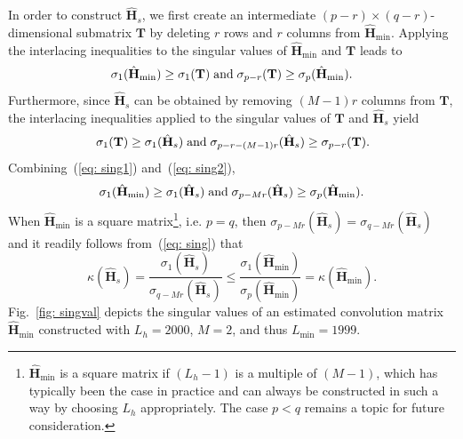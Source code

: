 \documentclass{article}
\begin{document}
In order to construct $\hat{\mathbf{H}}_s$, we first create an intermediate $(p-r)\times(q-r)$-dimensional submatrix $\mathbf{T}$ by deleting $r$ rows and $r$ columns from $\hat{\mathbf{H}}_{\min}$. 
Applying the interlacing inequalities to the singular values of $\hat{\mathbf{H}}_{\min}$ and $\mathbf{T}$ leads to
\begin{equation}
\label{eq: sing1}
  \sigma_{1}(\hat{\mathbf{H}}_{\min}) \geq \sigma_{1}(\mathbf{T}) \; {\rm and} \; \sigma_{p-r}(\mathbf{T})  \geq \sigma_{p}(\hat{\mathbf{H}}_{\min}).
\end{equation}
Furthermore, since $\hat{\mathbf{H}}_s$ can be obtained by removing $(M-1)r$ columns from $\mathbf{T}$, the interlacing inequalities applied to the singular values of $\mathbf{T}$ and $\hat{\mathbf{H}}_{s}$ yield
\begin{equation}
\label{eq: sing2}
\hspace{-0.02cm}  \sigma_{1}(\mathbf{T}) \geq \sigma_{1}(\hat{\mathbf{H}}_s) \; {\rm and} \;  \sigma_{p-r-(M-1)r}(\hat{\mathbf{H}}_s) \geq \sigma_{p-r}(\mathbf{T}). \hspace{-0.1cm}
\end{equation}
Combining~(\ref{eq: sing1}) and~(\ref{eq: sing2}),
\begin{equation}
\label{eq: sing}
 \sigma_1(\hat{\mathbf{H}}_{\min}) \geq \sigma_{1}(\hat{\mathbf{H}}_s) \; {\rm and} \; \sigma_{p-Mr}(\hat{\mathbf{H}}_s) \geq \sigma_{p}(\hat{\mathbf{H}}_{\min}).
\end{equation}
When $\hat{\mathbf{H}}_{\min}$ is a square matrix\footnote{$\hat{\mathbf{H}}_{\min}$ is a square matrix if $(L_h-1)$ is a multiple of $(M-1)$, which has typically been the case in practice and can always be constructed in such a way by choosing $L_h$ appropriately. The case $p<q$ remains a topic for future consideration.}, i.e. $p = q$, then $\sigma_{p-Mr}(\hat{\mathbf{H}}_s) = \sigma_{q-Mr}(\hat{\mathbf{H}}_s)$ and it readily follows from~(\ref{eq: sing}) that
\begin{equation}
\label{eq: condno}
\kappa(\hat{\mathbf{H}}_s) = \frac{\sigma_1(\hat{\mathbf{H}}_s)}{\sigma_{q-Mr}(\hat{\mathbf{H}}_s)} \leq \frac{\sigma_1(\hat{\mathbf{H}}_{\min})}{\sigma_{p}(\hat{\mathbf{H}}_{\min})} = \kappa(\hat{\mathbf{H}}_{\min}).
\end{equation}
Fig.~\ref{fig: singval} depicts the singular values of an estimated convolution matrix $\hat{\mathbf{H}}_{\min}$ constructed with $L_h = 2000$, $M=2$, and thus $L_{\min}=1999$. 
\end{document}
